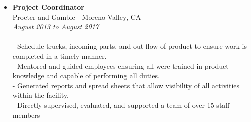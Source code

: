 \documentclass[11pt]{article}
\begin{document}
\begin{itemize}

\item \textbf{Project Coordinator }\\
Procter and Gamble - Moreno Valley, CA\\
\emph{August 2013 to August 2017}\\
\\
-	Schedule trucks, incoming parts, and out flow of product to ensure work is completed in a timely manner.\\
-	Mentored and guided employees ensuring all were trained in product knowledge and capable of performing all duties.\\
-	Generated reports and spread sheets that allow visibility of all activities within the facility.\\
-	Directly supervised, evaluated, and supported a team of over 15 staff members\\

\end{itemize}
\end{document}

